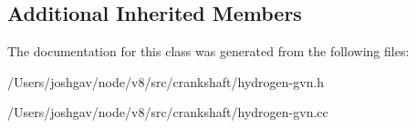 \subsection*{Additional Inherited Members}


The documentation for this class was generated from the following files\+:\begin{DoxyCompactItemize}
\item 
/\+Users/joshgav/node/v8/src/crankshaft/hydrogen-\/gvn.\+h\item 
/\+Users/joshgav/node/v8/src/crankshaft/hydrogen-\/gvn.\+cc\end{DoxyCompactItemize}
